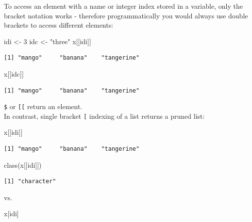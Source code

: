 \documentclass[
]{book}
\newenvironment{Shaded}{\begin{snugshade}}{\end{snugshade}}
\newcommand{\DecValTok}[1]{\textcolor[rgb]{0.00,0.00,0.81}{#1}}
\newcommand{\FunctionTok}[1]{\textcolor[rgb]{0.00,0.00,0.00}{#1}}
\newcommand{\NormalTok}[1]{#1}
\newcommand{\OtherTok}[1]{\textcolor[rgb]{0.56,0.35,0.01}{#1}}
\newcommand{\StringTok}[1]{\textcolor[rgb]{0.31,0.60,0.02}{#1}}
\begin{document}
To access an element with a name or integer index stored in a variable, only the bracket notation works - therefore programmatically you would always use double brackets to access different elements:

\begin{Shaded}
\begin{Highlighting}[]
\NormalTok{idi }\OtherTok{\textless{}{-}} \DecValTok{3}
\NormalTok{idc }\OtherTok{\textless{}{-}} \StringTok{"three"}
\NormalTok{x[[idi]]}
\end{Highlighting}
\end{Shaded}

\begin{verbatim}
[1] "mango"     "banana"    "tangerine"
\end{verbatim}

\begin{Shaded}
\begin{Highlighting}[]
\NormalTok{x[[idc]]}
\end{Highlighting}
\end{Shaded}

\begin{verbatim}
[1] "mango"     "banana"    "tangerine"
\end{verbatim}

\texttt{\$} or \texttt{{[}{[}} return an element.\\
In contrast, single bracket \texttt{{[}} indexing of a list returns a pruned list:

\begin{Shaded}
\begin{Highlighting}[]
\NormalTok{x[[idi]]}
\end{Highlighting}
\end{Shaded}

\begin{verbatim}
[1] "mango"     "banana"    "tangerine"
\end{verbatim}

\begin{Shaded}
\begin{Highlighting}[]
\FunctionTok{class}\NormalTok{(x[[idi]])}
\end{Highlighting}
\end{Shaded}

\begin{verbatim}
[1] "character"
\end{verbatim}

vs.

\begin{Shaded}
\begin{Highlighting}[]
\NormalTok{x[idi]}
\end{Highlighting}
\end{Shaded}
\end{document}

